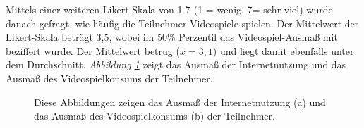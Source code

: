 \documentclass[a4paper,11pt]{article}%
\renewcommand{\\}{\vspace*{0.5\baselineskip} \newline}
\begin{document}
{Mittels einer weiteren Likert-Skala von 1-7 (1 = wenig, 7= sehr viel) wurde danach gefragt, wie häufig die Teilnehmer Videospiele spielen. Der Mittelwert der Likert-Skala beträgt 3,5, wobei im 50\% Perzentil das Videospiel-Ausmaß mit \grqq{} beziffert wurde. Der Mittelwert betrug ($\bar{x} = 3,1$) und liegt damit ebenfalls unter dem Durchschnitt.
\textit{Abbildung \ref{teilnehmerInternetVideospiele}} zeigt das Ausmaß der Internetnutzung und das Ausmaß des Videospielkonsums der Teilnehmer.
\begin{figure}[h]
  \centering
  \qquad
  \caption[Das Ausmaß der Internetnutzung und des Videospielkonsums der Teilnehmer]{Diese Abbildungen zeigen das Ausmaß der Internetnutzung (a) und das Ausmaß des Videospielkonsums (b) der Teilnehmer.}
  \label{teilnehmerInternetVideospiele}
\end{figure}

	
}
\end{document}
